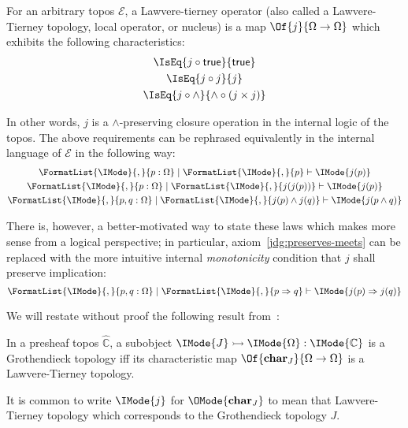 \documentclass{article}
\newcommand\Char[1]{\mathbf{char}_{#1}}
\newcommand\Psh[1]{\widehat{#1}}
\newcommand\IsSubobject[3]{\IMode{#1}\rightarrowtail\IMode{#2}:\IMode{#3}}
\newcommand\True{\mathsf{true}}
\begin{document}
\newcommand\Seq[3]{\FormatList{\IMode}{,}{#1}\mid\FormatList{\IMode}{,}{#2}\vdash\IMode{#3}}

\begin{definition}\label{def:lawvere-tierney}
  For an arbitrary topos $\mathcal{E}$, a Lawvere-tierney operator
  (also called a Lawvere-Tierney topology, local operator, or nucleus)
  is a map $\Of{j}{\Omega\to\Omega}$ which exhibits the following
  characteristics:
  \begin{gather}
    \IsEq{j\circ\True}{\True}
    \label{eq:preserves-true}
    \\
    \IsEq{j\circ j}{j}
    \label{eq:idempotency}
    \\
    \IsEq{j\circ\land}{\land\circ(j\times j)}
    \label{eq:preserves-meets}
  \end{gather}
\end{definition}


In other words, $j$ is a $\land$-preserving closure operation in the
internal logic of the topos. The above requirements can be rephrased
equivalently in the internal language of $\mathcal{E}$ in the
following way:
\begin{gather}
  \Seq{p:\Omega}{p}{j(p)}
  \\
  \Seq{p:\Omega}{j(j(p))}{j(p)}
  \label{jdg:idempotency}
  \\
  \Seq{p,q:\Omega}{j(p)\land j(q)}{j(p\land q)}
  \label{jdg:preserves-meets}
\end{gather}


There is, however, a better-motivated way to state these laws which
makes more sense from a logical perspective; in particular,
axiom~\ref{jdg:preserves-meets} can be replaced with the more
intuitive internal \emph{monotonicity} condition that $j$ shall
preserve implication:
\begin{equation}
  \Seq{p,q:\Omega}{p\Rightarrow q}{j(p)\Rightarrow j(q)}
  \label{jdg:monotonicity}
\end{equation}

We will restate without proof the following result
from~\cite{maclane-moerdijk:1992}:
\begin{prop}
  In a presheaf topos $\Psh{\mathbb{C}}$, a subobject
  $\IsSubobject{J}{\Omega}{\mathbb{C}}$ is a Grothendieck topology iff
  its characteristic map $\Of{\Char{J}}{\Omega\to\Omega}$ is a
  Lawvere-Tierney topology.
\end{prop}

\begin{notation}
  It is common to write $\IMode{j}$ for $\OMode{\Char{J}}$ to mean
  that Lawvere-Tierney topology which corresponds to the Grothendieck
  topology $J$.
\end{notation}
\end{document}
